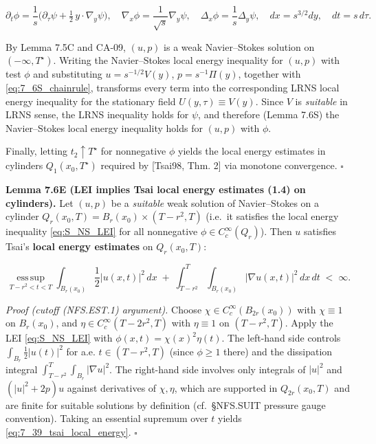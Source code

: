 \documentclass[
  11pt,
]{article}
\begin{document}
\begin{equation}
\partial_t\phi=\frac{1}{s}\Big(\partial_\tau\psi+\tfrac12\,y\cdot\nabla_y\psi\Big),\quad
\nabla_x\phi=\frac{1}{\sqrt{s}}\nabla_y\psi,\quad
\Delta_x\phi=\frac{1}{s}\Delta_y\psi,\quad
dx=s^{3/2}dy,\quad dt=s\,d\tau.
\tag{7.6S.1}\label{eq:7_6S_chainrule}
\end{equation}

By Lemma 7.5C and CA-09, \((u,p)\) is a weak Navier--Stokes solution on \((-\infty,T^\star)\). Writing the Navier--Stokes local energy inequality for \((u,p)\) with test \(\phi\) and substituting \(u=s^{-1/2}V(y)\), \(p=s^{-1}\Pi(y)\), together with \eqref{eq:7_6S_chainrule}, transforms every term into the corresponding LRNS local energy inequality for the stationary field \(U(y,\tau)\equiv V(y)\). Since \(V\) is \emph{suitable} in LRNS sense, the LRNS inequality holds for \(\psi\), and therefore (Lemma 7.6S) the Navier--Stokes local energy inequality holds for \((u,p)\) with \(\phi\).

Finally, letting \(t_2\uparrow T^\star\) for nonnegative \(\phi\) yields the local energy estimates in cylinders \(Q_1(x_0,T^\star)\) required by {[}Tsai98, Thm. 2{]} via monotone convergence. \(\square\)

\textbf{Lemma 7.6E (LEI implies Tsai local energy estimates (1.4) on cylinders).} Let \((u,p)\) be a \emph{suitable} weak solution of Navier--Stokes on a cylinder \(Q_r(x_0,T)=B_r(x_0)\times(T-r^2,T)\) (i.e.~it satisfies the local energy inequality \eqref{eq:S_NS_LEI} for all nonnegative \(\phi\in C_c^\infty(Q_r)\)). Then \(u\) satisfies Tsai's \textbf{local energy estimates} on \(Q_r(x_0,T)\):

\begin{equation}
\operatorname*{ess\,sup}_{T-r^2<t<T}\int_{B_r(x_0)}\frac12|u(x,t)|^2\,dx
\;+\;\int_{T-r^2}^{T}\int_{B_r(x_0)}|\nabla u(x,t)|^2\,dx\,dt
\;<\;\infty.
\tag{7.39}\label{eq:7_39_tsai_local_energy}
\end{equation}

\emph{Proof (cutoff (NFS.EST.1) argument).} Choose \(\chi\in C_c^\infty(B_{2r}(x_0))\) with \(\chi\equiv 1\) on \(B_r(x_0)\), and \(\eta\in C_c^\infty(T-2r^2,T)\) with \(\eta\equiv 1\) on \((T-r^2,T)\). Apply the LEI \eqref{eq:S_NS_LEI} with \(\phi(x,t)=\chi(x)^2\eta(t)\). The left-hand side controls \(\int_{B_r}\frac12|u(t)|^2\) for a.e. \(t\in(T-r^2,T)\) (since \(\phi\ge 1\) there) and the dissipation integral \(\int_{T-r^2}^{T}\int_{B_r}|\nabla u|^2\). The right-hand side involves only integrals of \(|u|^2\) and \((|u|^2+2p)u\) against derivatives of \(\chi,\eta\), which are supported in \(Q_{2r}(x_0,T)\) and are finite for suitable solutions by definition (cf.~§NFS.SUIT pressure gauge convention). Taking an essential supremum over \(t\) yields \eqref{eq:7_39_tsai_local_energy}. \(\square\)
\end{document}
